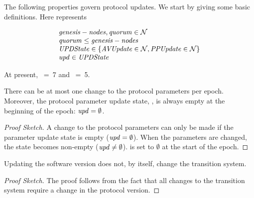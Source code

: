 The following properties govern protocol updates.  We start by giving some basic definitions.  Here  represents

\begin{definition}
  $$
  \begin{array}{l}
    \mathit{genesis-nodes}, \mathit{quorum} \in \cal{N}\\
    \mathit{quorum} \le \mathit{genesis-nodes} \\
    \mathit{UPDState} \in \{ \mathit{AVUpdate}  \in \cal{N}, \mathit{PPUpdate} \in \cal{N} \} \\
    \mathit{upd} \in \mathit{UPDState}
  \end{array}
  $$
\end{definition}

At present, ~=~7 and ~=~5.

\begin{property}
  There can be at most one change to the protocol parameters per epoch. Moreover, the protocol parameter update state, , is always empty at the beginning of the epoch: $\mathit{upd} = \emptyset$.
\end{property}

\begin{proof}[Proof Sketch]
  A change to the protocol parameters can only be made if the parameter update state is empty ($\mathit{upd} = \emptyset$).  When the parameters are changed, the state becomes non-empty ($\mathit{upd} \ne \emptyset$).
   is set to $\emptyset$ at the start of the epoch.
\end{proof}


\begin{property}
  Updating the software version does not, by itself, change the transition system.
\end{property}

\begin{proof}[Proof Sketch]
  The proof follows from the fact that all changes to the transition system require a change in the protocol version.
\end{proof}

